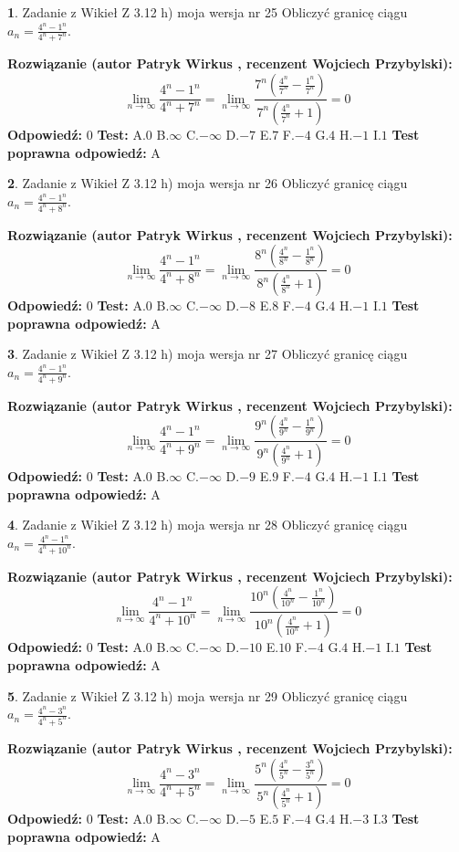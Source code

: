 \documentclass[12pt, a4paper]{article}
\theoremstyle{definition} %
\newtheorem{zad}{}
\newcommand{\zadStart}[1]{\begin{zad}#1\newline}
\newcommand{\zadStop}{\end{zad}}
\newcommand{\rozwStart}[2]{\noindent \textbf{Rozwiązanie (autor #1 , recenzent #2): }\newline}
\newcommand{\rozwStop}{\newline}
\newcommand{\odpStart}{\noindent \textbf{Odpowiedź:}\newline}
\newcommand{\odpStop}{\newline}
\newcommand{\testStart}{\noindent \textbf{Test:}\newline}
\newcommand{\testStop}{\newline}
\newcommand{\kluczStart}{\noindent \textbf{Test poprawna odpowiedź:}\newline}
\newcommand{\kluczStop}{\newline}
\begin{document}
\zadStart{Zadanie z Wikieł Z 3.12 h) moja wersja nr 25}
Obliczyć granicę ciągu $a_{n}=\frac{4^{n} - 1^{n}}{4^{n} + 7^{n}}$.
\zadStop
\rozwStart{Patryk Wirkus}{Wojciech Przybylski}
$$\lim\limits_{n\to\infty}\frac{4^{n} - 1^{n}}{4^{n} + 7^{n}} = \lim\limits_{n\to\infty}\frac{7^{n}(\frac{4^{n}}{7^{n}} - \frac{1^{n}}{7^{n}})}{7^{n}(\frac{4^{n}}{7^{n}} + 1)} = 0$$
\rozwStop
\odpStart
$0$
\odpStop
\testStart
A.$0$
B.$\infty$
C.$-\infty$
D.$-7$
E.$7$
F.$-4$
G.$4$
H.$-1$
I.$1$
\testStop
\kluczStart
A
\kluczStop



\zadStart{Zadanie z Wikieł Z 3.12 h) moja wersja nr 26}
Obliczyć granicę ciągu $a_{n}=\frac{4^{n} - 1^{n}}{4^{n} + 8^{n}}$.
\zadStop
\rozwStart{Patryk Wirkus}{Wojciech Przybylski}
$$\lim\limits_{n\to\infty}\frac{4^{n} - 1^{n}}{4^{n} + 8^{n}} = \lim\limits_{n\to\infty}\frac{8^{n}(\frac{4^{n}}{8^{n}} - \frac{1^{n}}{8^{n}})}{8^{n}(\frac{4^{n}}{8^{n}} + 1)} = 0$$
\rozwStop
\odpStart
$0$
\odpStop
\testStart
A.$0$
B.$\infty$
C.$-\infty$
D.$-8$
E.$8$
F.$-4$
G.$4$
H.$-1$
I.$1$
\testStop
\kluczStart
A
\kluczStop



\zadStart{Zadanie z Wikieł Z 3.12 h) moja wersja nr 27}
Obliczyć granicę ciągu $a_{n}=\frac{4^{n} - 1^{n}}{4^{n} + 9^{n}}$.
\zadStop
\rozwStart{Patryk Wirkus}{Wojciech Przybylski}
$$\lim\limits_{n\to\infty}\frac{4^{n} - 1^{n}}{4^{n} + 9^{n}} = \lim\limits_{n\to\infty}\frac{9^{n}(\frac{4^{n}}{9^{n}} - \frac{1^{n}}{9^{n}})}{9^{n}(\frac{4^{n}}{9^{n}} + 1)} = 0$$
\rozwStop
\odpStart
$0$
\odpStop
\testStart
A.$0$
B.$\infty$
C.$-\infty$
D.$-9$
E.$9$
F.$-4$
G.$4$
H.$-1$
I.$1$
\testStop
\kluczStart
A
\kluczStop



\zadStart{Zadanie z Wikieł Z 3.12 h) moja wersja nr 28}
Obliczyć granicę ciągu $a_{n}=\frac{4^{n} - 1^{n}}{4^{n} + 10^{n}}$.
\zadStop
\rozwStart{Patryk Wirkus}{Wojciech Przybylski}
$$\lim\limits_{n\to\infty}\frac{4^{n} - 1^{n}}{4^{n} + 10^{n}} = \lim\limits_{n\to\infty}\frac{10^{n}(\frac{4^{n}}{10^{n}} - \frac{1^{n}}{10^{n}})}{10^{n}(\frac{4^{n}}{10^{n}} + 1)} = 0$$
\rozwStop
\odpStart
$0$
\odpStop
\testStart
A.$0$
B.$\infty$
C.$-\infty$
D.$-10$
E.$10$
F.$-4$
G.$4$
H.$-1$
I.$1$
\testStop
\kluczStart
A
\kluczStop



\zadStart{Zadanie z Wikieł Z 3.12 h) moja wersja nr 29}
Obliczyć granicę ciągu $a_{n}=\frac{4^{n} - 3^{n}}{4^{n} + 5^{n}}$.
\zadStop
\rozwStart{Patryk Wirkus}{Wojciech Przybylski}
$$\lim\limits_{n\to\infty}\frac{4^{n} - 3^{n}}{4^{n} + 5^{n}} = \lim\limits_{n\to\infty}\frac{5^{n}(\frac{4^{n}}{5^{n}} - \frac{3^{n}}{5^{n}})}{5^{n}(\frac{4^{n}}{5^{n}} + 1)} = 0$$
\rozwStop
\odpStart
$0$
\odpStop
\testStart
A.$0$
B.$\infty$
C.$-\infty$
D.$-5$
E.$5$
F.$-4$
G.$4$
H.$-3$
I.$3$
\testStop
\kluczStart
A
\kluczStop
\end{document}
